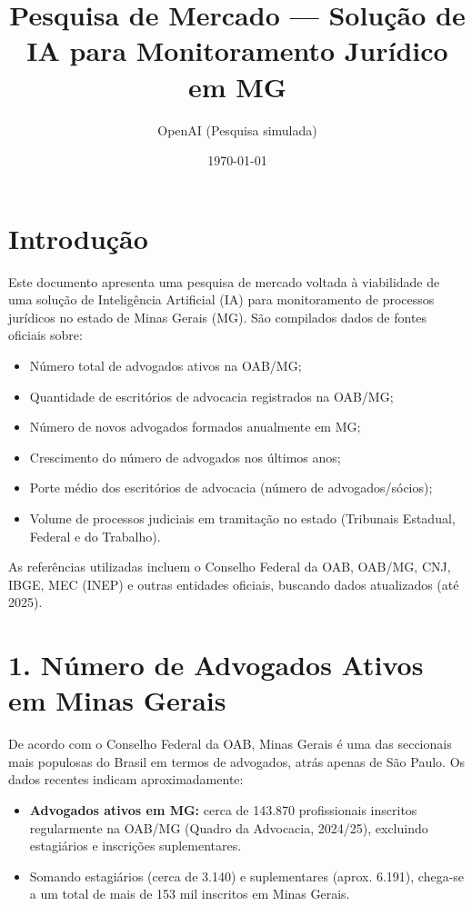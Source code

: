 \documentclass{article}
\title{Pesquisa de Mercado --- Solução de IA para Monitoramento Jurídico em MG}
\author{OpenAI (Pesquisa simulada)}
\date{\today}
\begin{document}
\maketitle

\section{Introdução}
Este documento apresenta uma pesquisa de mercado voltada à viabilidade de uma solução de Inteligência Artificial (IA) para monitoramento de processos jurídicos no estado de Minas Gerais (MG). São compilados dados de fontes oficiais sobre:
\begin{itemize}
\item Número total de advogados ativos na OAB/MG;
\item Quantidade de escritórios de advocacia registrados na OAB/MG;
\item Número de novos advogados formados anualmente em MG;
\item Crescimento do número de advogados nos últimos anos;
\item Porte médio dos escritórios de advocacia (número de advogados/sócios);
\item Volume de processos judiciais em tramitação no estado (Tribunais Estadual, Federal e do Trabalho).
\end{itemize}

As referências utilizadas incluem o Conselho Federal da OAB, OAB/MG, CNJ, IBGE, MEC (INEP) e outras entidades oficiais, buscando dados atualizados (até 2025).

\section{1. Número de Advogados Ativos em Minas Gerais}
De acordo com o Conselho Federal da OAB, Minas Gerais é uma das seccionais mais populosas do Brasil em termos de advogados, atrás apenas de São Paulo. Os dados recentes indicam aproximadamente:
\begin{itemize}
\item \textbf{Advogados ativos em MG:} cerca de 143.870 profissionais inscritos regularmente na OAB/MG (Quadro da Advocacia, 2024/25), excluindo estagiários e inscrições suplementares.
\item Somando estagiários (cerca de 3.140) e suplementares (aprox. 6.191), chega-se a um total de mais de 153 mil inscritos em Minas Gerais.
\end{itemize}
\end{document}
